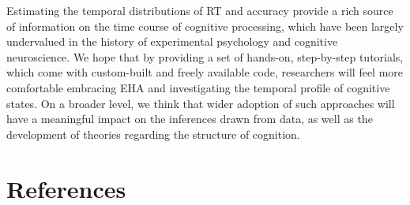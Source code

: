 \documentclass[
  man, donotrepeattitle,floatsintext]{apa6}
\begin{document}
Estimating the temporal distributions of RT and accuracy provide a rich source of information on the time course of cognitive processing, which have been largely undervalued in the history of experimental psychology and cognitive neuroscience. We hope that by providing a set of hands-on, step-by-step tutorials, which come with custom-built and freely available code, researchers will feel more comfortable embracing EHA and investigating the temporal profile of cognitive states. On a broader level, we think that wider adoption of such approaches will have a meaningful impact on the inferences drawn from data, as well as the development of theories regarding the structure of cognition.

\newpage

\section{References}\label{references}
\end{document}
